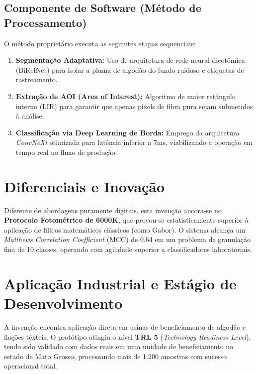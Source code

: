 \documentclass[12pt,a4paper]{article}
\begin{document}
\subsection{Componente de Software (Método de Processamento)}
O método proprietário executa as seguintes etapas sequenciais:
\begin{enumerate}
    \item \textbf{Segmentação Adaptativa:} Uso de arquitetura de rede neural dicotômica (BiRefNet) para isolar a pluma de algodão do fundo ruidoso e etiquetas de rastreamento.
    \item \textbf{Extração de AOI (Area of Interest):} Algoritmo de maior retângulo interno (LIR) para garantir que apenas pixels de fibra pura sejam submetidos à análise.
    \item \textbf{Classificação via Deep Learning de Borda:} Emprego da arquitetura \textit{ConvNeXt} otimizada para latência inferior a 7ms, viabilizando a operação em tempo real no fluxo de produção.
\end{enumerate}

\section{Diferenciais e Inovação}
Diferente de abordagens puramente digitais, esta invenção ancora-se no \textbf{Protocolo Fotométrico de 6000K}, que provou-se estatisticamente superior à aplicação de filtros matemáticos clássicos (como Gabor). O sistema alcança um \textit{Matthews Correlation Coefficient} (MCC) de 0.64 em um problema de granulação fina de 10 classes, operando com agilidade superior a classificadores laboratoriais.

\section{Aplicação Industrial e Estágio de Desenvolvimento}
A invenção encontra aplicação direta em usinas de beneficiamento de algodão e fiações têxteis. O protótipo atingiu o nível \textbf{TRL 5} (\textit{Technology Readiness Level}), tendo sido validado com dados reais em uma unidade de beneficiamento no estado de Mato Grosso, processando mais de 1.200 amostras com sucesso operacional total.
\end{document}
